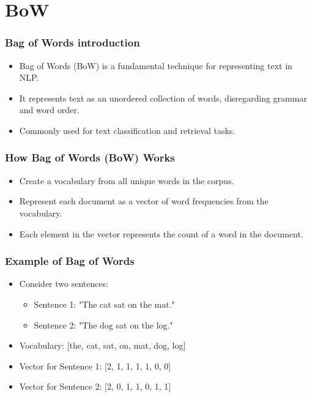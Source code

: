 \documentclass{beamer}
\begin{document}
\section{BoW}

\begin{frame}
    \frametitle{Bag of Words introduction}
    \begin{itemize}
        \item Bag of Words (BoW) is a fundamental technique for representing text in NLP.
        \item It represents text as an unordered collection of words, disregarding grammar and word order.
        \item Commonly used for text classification and retrieval tasks.
    \end{itemize}
\end{frame}

\begin{frame}
    \frametitle{How Bag of Words (BoW) Works}
    \begin{itemize}
        \item Create a vocabulary from all unique words in the corpus.
        \item Represent each document as a vector of word frequencies from the vocabulary.
        \item Each element in the vector represents the count of a word in the document.
    \end{itemize}
\end{frame}

\begin{frame}
    \frametitle{Example of Bag of Words}
    \begin{itemize}
        \item Consider two sentences:
        \begin{itemize}
            \item Sentence 1: "The cat sat on the mat."
            \item Sentence 2: "The dog sat on the log."
        \end{itemize}
        \item Vocabulary: [the, cat, sat, on, mat, dog, log]
        \item Vector for Sentence 1: [2, 1, 1, 1, 1, 0, 0]
        \item Vector for Sentence 2: [2, 0, 1, 1, 0, 1, 1]
    \end{itemize}
\end{frame}
\end{document}
